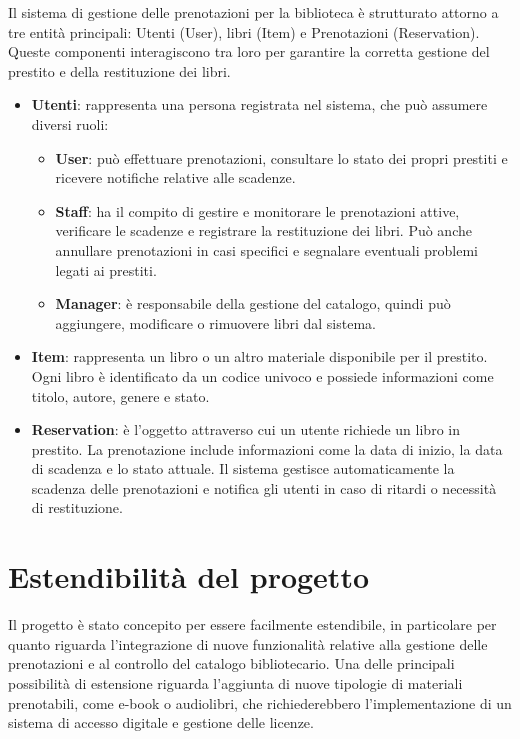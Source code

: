 \documentclass[twoside,openright,titlepage,fleqn,headinclude,12pt,a4paper,BCOR=5mm,footinclude]{scrbook}
\begin{document}
Il sistema di gestione delle prenotazioni per la biblioteca è strutturato attorno a tre entità principali: Utenti (User), libri (Item) e Prenotazioni (Reservation). Queste componenti interagiscono tra loro per garantire la corretta gestione del prestito e della restituzione dei libri.
\begin{itemize}
    \item \textbf{Utenti}: rappresenta una persona registrata nel sistema, che può assumere diversi ruoli:
        \begin{itemize}
            \item \textbf{User}: può effettuare prenotazioni, consultare lo stato dei propri prestiti e ricevere notifiche relative alle scadenze.
            
            \item \textbf{Staff}:  ha il compito di gestire e monitorare le prenotazioni attive, verificare le scadenze e registrare la restituzione dei libri. Può anche annullare prenotazioni in casi specifici e segnalare eventuali problemi legati ai prestiti.

            \item \textbf{Manager}:  è responsabile della gestione del catalogo, quindi può aggiungere, modificare o rimuovere libri dal sistema.
            
        \end{itemize}
    
    \item \textbf{Item}: rappresenta un libro o un altro materiale disponibile per il prestito. Ogni libro è identificato da un codice univoco e possiede informazioni come titolo, autore, genere e stato. 
    
    \item \textbf{Reservation}: è l'oggetto attraverso cui un utente richiede un libro in prestito. La prenotazione include informazioni come la data di inizio, la data di scadenza e lo stato attuale. Il sistema gestisce automaticamente la scadenza delle prenotazioni e notifica gli utenti in caso di ritardi o necessità di restituzione.
    
\end{itemize}

\section{Estendibilità del progetto}

Il progetto è stato concepito per essere facilmente estendibile, in particolare per quanto riguarda l’integrazione di nuove funzionalità relative alla gestione delle prenotazioni e al controllo del catalogo bibliotecario. Una delle principali possibilità di estensione riguarda l’aggiunta di nuove tipologie di materiali prenotabili, come e-book o audiolibri, che richiederebbero l’implementazione di un sistema di accesso digitale e gestione delle licenze.
\end{document}
